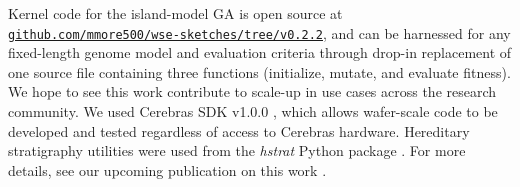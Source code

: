 Kernel code for the island-model GA is open source at\\ \href{https://github.com/mmore500/wse-sketches/tree/v0.2.2}{\texttt{github.com/mmore500/wse-sketches/tree/v0.2.2}}, and can be harnessed for any fixed-length genome model and evaluation criteria through drop-in replacement of one source file containing three functions (initialize, mutate, and evaluate fitness).
We hope to see this work contribute to scale-up in use cases across the research community.
We used Cerebras SDK v1.0.0 \citep{selig2022cerebras}, which allows wafer-scale code to be developed and tested regardless of access to Cerebras hardware.
Hereditary stratigraphy utilities were used from the \textit{hstrat} Python package \citep{moreno2022hstrat}.
For more details, see our upcoming publication on this work \citep{moreno2024trackable}.
